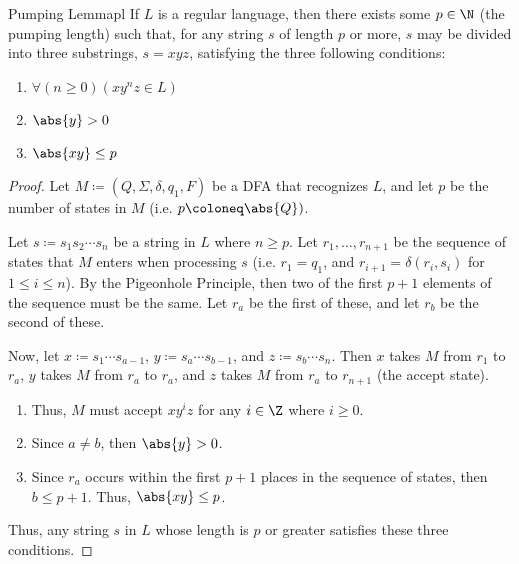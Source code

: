 \documentclass[math]{amznotes}
\begin{document}
\begin{thmbox}{Pumping Lemma}{pl}
    If $L$ is a regular language, then there exists some $p \in \N$ (the pumping length) such that, for any string $s$ of length $p$ or more, $s$ may be divided into three substrings, $s = x y z$, satisfying the three following conditions:
    \begin{enumerate}[noitemsep]
        \item $\forall (n \geq 0) \left( x y^n z \in L \right)$
        \item $\abs{y} > 0$
        \item $\abs{x y} \leq p$
    \end{enumerate}
    \tcblower
    \begin{proof}
        Let $M \coloneq  (Q, \Sigma, \delta, q_1, F)$ be a DFA that recognizes $L$, and let $p$ be the number of states in $M$ (i.e. $p \coloneq \abs{Q})$.

        Let $s \coloneq s_1 s_2 \cdots s_n$ be a string in $L$ where $n \geq p$. Let $r_1, \ldots, r_{n+1}$ be the sequence of states that $M$ enters when processing $s$ (i.e. $r_1 = q_1$, and $r_{i+1} = \delta(r_i, s_i)$ for $1 \leq i \leq n$). By the Pigeonhole Principle, then two of the first $p+1$ elements of the sequence must be the same. Let $r_a$ be the first of these, and let $r_b$ be the second of these.

        Now, let $x \coloneq s_1 \cdots s_{a-1}$, $y \coloneq s_a \cdots s_{b-1}$, and $z \coloneq s_b \cdots s_n$. Then $x$ takes $M$ from $r_1$ to $r_a$, $y$ takes $M$ from $r_a$ to $r_a$, and $z$ takes $M$ from $r_a$ to $r_{n+1}$ (the accept state).
        \begin{enumerate}
            \item Thus, $M$ must accept $xy^iz$ for any $i \in \Z$ where $i \geq 0$.
            \item Since $a \neq b$, then $\abs{y} > 0$.
            \item Since $r_a$ occurs within the first $p+1$ places in the sequence of states, then $b \leq p+1$. Thus, $\abs{xy} \leq p$.
        \end{enumerate}
        Thus, any string $s$ in $L$ whose length is $p$ or greater satisfies these three conditions.
    \end{proof}
\end{thmbox}
\end{document}
